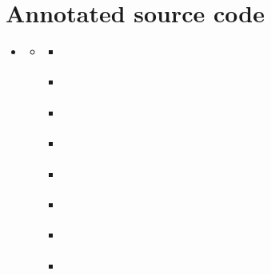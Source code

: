 \documentclass[letterpaper,10pt,english]{sphinxmanual}
\begin{document}
\chapter{Annotated source code}
\label{\detokenize{annotation:annotated-source-code}}\label{\detokenize{annotation:as}}\label{\detokenize{annotation::doc}}
\begin{sphinxShadowBox}
\begin{itemize}
\item {} 
\label{\detokenize{annotation:id59}}{\hyperref[\detokenize{annotation:annotated-source-code}]{}}
\begin{itemize}
\item {} 
\label{\detokenize{annotation:id60}}{\hyperref[\detokenize{annotation:tasks}]{}}
\begin{itemize}
\item {} 
\label{\detokenize{annotation:id61}}{\hyperref[\detokenize{annotation:main-yml}]{}}

\item {} 
\label{\detokenize{annotation:id62}}{\hyperref[\detokenize{annotation:acpi-yml}]{}}

\item {} 
\label{\detokenize{annotation:id63}}{\hyperref[\detokenize{annotation:aliases-yml}]{}}

\item {} 
\label{\detokenize{annotation:id64}}{\hyperref[\detokenize{annotation:apparmor-yml}]{}}

\item {} 
\label{\detokenize{annotation:id65}}{\hyperref[\detokenize{annotation:authorized-keys-yml}]{}}

\item {} 
\label{\detokenize{annotation:id66}}{\hyperref[\detokenize{annotation:autofs-yml}]{}}

\item {} 
\label{\detokenize{annotation:id67}}{\hyperref[\detokenize{annotation:auto-upgrades-yml}]{}}

\item {} 
\label{\detokenize{annotation:id68}}{\hyperref[\detokenize{annotation:bluetooth-yml}]{}}


\end{itemize}
\end{itemize}
\end{itemize}
\end{sphinxShadowBox}
\end{document}
